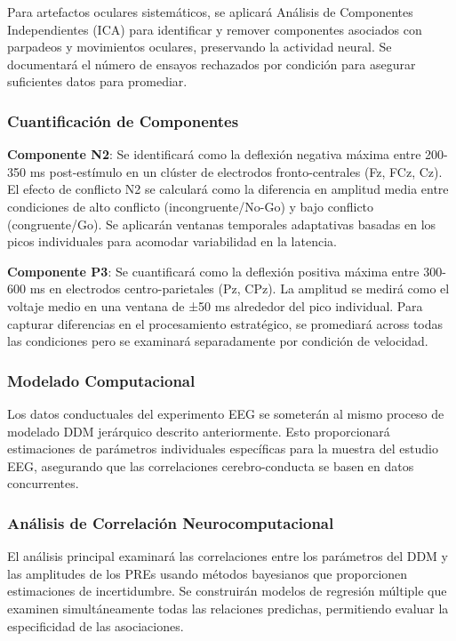 \documentclass[
  spanish,
  10pt,
]{article}
\begin{document}
Para artefactos oculares sistemáticos, se aplicará Análisis de
Componentes Independientes (ICA) para identificar y remover componentes
asociados con parpadeos y movimientos oculares, preservando la actividad
neural. Se documentará el número de ensayos rechazados por condición
para asegurar suficientes datos para promediar.

\subsubsection{Cuantificación de
Componentes}\label{cuantificaciuxf3n-de-componentes}

\textbf{Componente N2}: Se identificará como la deflexión negativa
máxima entre 200-350 ms post-estímulo en un clúster de electrodos
fronto-centrales (Fz, FCz, Cz). El efecto de conflicto N2 se calculará
como la diferencia en amplitud media entre condiciones de alto conflicto
(incongruente/No-Go) y bajo conflicto (congruente/Go). Se aplicarán
ventanas temporales adaptativas basadas en los picos individuales para
acomodar variabilidad en la latencia.

\textbf{Componente P3}: Se cuantificará como la deflexión positiva
máxima entre 300-600 ms en electrodos centro-parietales (Pz, CPz). La
amplitud se medirá como el voltaje medio en una ventana de ±50 ms
alrededor del pico individual. Para capturar diferencias en el
procesamiento estratégico, se promediará across todas las condiciones
pero se examinará separadamente por condición de velocidad.

\subsubsection{Modelado Computacional}\label{modelado-computacional}

Los datos conductuales del experimento EEG se someterán al mismo proceso
de modelado DDM jerárquico descrito anteriormente. Esto proporcionará
estimaciones de parámetros individuales específicas para la muestra del
estudio EEG, asegurando que las correlaciones cerebro-conducta se basen
en datos concurrentes.

\subsubsection{Análisis de Correlación
Neurocomputacional}\label{anuxe1lisis-de-correlaciuxf3n-neurocomputacional}

El análisis principal examinará las correlaciones entre los parámetros
del DDM y las amplitudes de los PREs usando métodos bayesianos que
proporcionen estimaciones de incertidumbre. Se construirán modelos de
regresión múltiple que examinen simultáneamente todas las relaciones
predichas, permitiendo evaluar la especificidad de las asociaciones.
\end{document}
